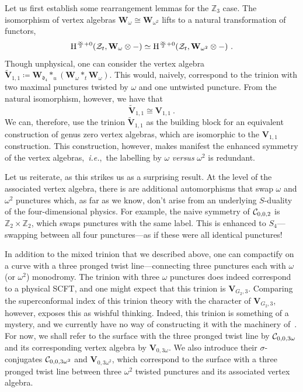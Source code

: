 \documentclass[a4paper]{article}
\def\IZ{\mathbb{Z}}
\def\CC{{\cal C}}
\def\ZZ{{\cal Z}}
\def\df{\mathfrak{d}}
\def \ie{{\it i.e.}}
\newcommand{\Hi}[1]{\mathrm{H}^{\frac{\infty}{2}+#1}}
\def\W{\mathbf{W}}
\def\V{\mathbf{V}}
\begin{document}
Let us first establish some rearrangement lemmas for the $\IZ_3$ case. The isomorphism of vertex algebras $\W_\omega\cong\W_{\omega^2}$ lifts to a natural transformation of functors,
\begin{equation}
    \Hi{0}(\ZZ_t,\W_\omega\otimes-) \simeq \Hi{0}(\ZZ_t,\W_{\omega^2}\otimes-)~.
\end{equation}
Though unphysical, one can consider the vertex algebra $\widetilde{\V}_{1,1}\coloneqq \W_{\df_4}\ast_u(\W_\omega\ast_t\W_\omega)$. This would, naively, correspond to the trinion with two maximal punctures twisted by $\omega$ and one untwisted puncture.
From the natural isomorphism, however, we have that
\begin{equation}
    \widetilde{\V}_{1,1}\cong \V_{1,1}~.
\end{equation}
We can, therefore, use the trinion $\widetilde{\V}_{1,1}$ as the building block for an equivalent construction of genus zero vertex algebras, which are isomorphic to the $\V_{1,1}$ construction. This construction, however, makes manifest the enhanced symmetry of the vertex algebras,~\ie,~the labelling by $\omega$ \emph{versus} $\omega^2$ is redundant.

Let us reiterate, as this strikes us as a surprising result. At the level of the associated vertex algebra, there is are additional automorphisms that swap $\omega$ and $\omega^2$ punctures which, as far as we know, don't arise from an underlying $S$-duality of the four-dimensional physics. For example, the naive symmetry of $\CC_{0,0,2}$ is $\IZ_2\times\IZ_2$, which swaps punctures with the same label. This is enhanced to $S_4$---swapping between all four punctures---as if these were all identical punctures!

In addition to the mixed trinion that we described above, one can compactify on a curve with a three pronged twist line---connecting three punctures each with $\omega$ (or $\omega^2$) monodromy. The trinion with three $\omega$ punctures does indeed correspond to a physical SCFT, and one might expect that this trinion is $\V_{G_2,3}$. Comparing the superconformal index of this trinion theory with the character of $\V_{G_2,3}$, however, exposes this as wishful thinking. Indeed, this trinion is something of a mystery, and we currently have no way of constructing it with the machinery of~\cite{Arakawa:2018egx}. For now, we shall refer to the surface with the three pronged twist line by $\CC_{0,0,3\omega}$ and its corresponding vertex algebra by $\V_{0,3\omega}$. We also introduce their $\sigma$-conjugates $\CC_{0,0,3\omega^2}$ and $\V_{0,3\omega^2}$, which correspond to the surface with a three pronged twist line between three $\omega^2$ twisted punctures and its associated vertex algebra.
\end{document}
